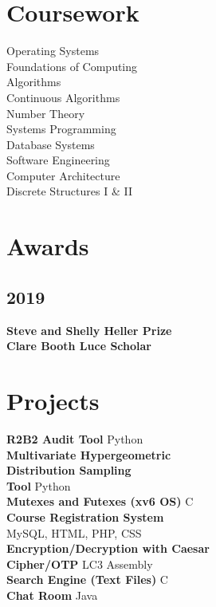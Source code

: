\documentclass[]{deedy-resume-openfont}
\begin{document}
\begin{minipage}[t]{0.33\textwidth}
        \section{Coursework}
        Operating Systems\\
        Foundations of Computing\\
        Algorithms\\
        Continuous Algorithms\\
        Number Theory\\
        Systems Programming\\
        Database Systems\\
        Software Engineering\\
        Computer Architecture\\
        Discrete Structures I \& II \\


        \section{Awards}
        \subsection{2019}
        {\bf Steve and Shelly Heller Prize} \\
        {\bf Clare Booth Luce Scholar} \\

        \section{Projects}

        \textbf{R2B2 Audit Tool} Python\\
        \textbf{Multivariate Hypergeometric \\Distribution Sampling \\Tool} Python\\
        \textbf{Mutexes and Futexes (xv6 OS)} C\\
        \textbf{Course Registration System} \\MySQL, HTML, PHP, CSS\\
        \textbf{Encryption/Decryption with Caesar \\Cipher/OTP} LC3 Assembly\\
        \textbf{Search Engine (Text Files)} C\\
        \textbf{Chat Room} Java\\


\end{minipage}
\end{document}
